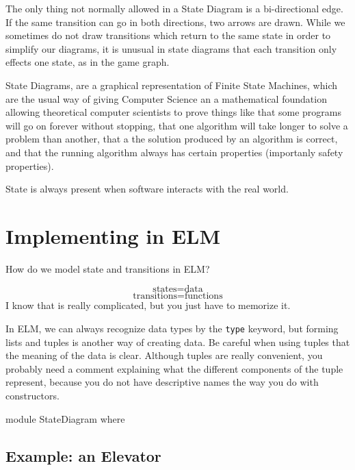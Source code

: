 \documentclass[12pt]{amsbook}
\begin{document}
The only thing not normally allowed in a State Diagram is a bi-directional edge.
If the same transition can go in both directions, two arrows are drawn.
While we sometimes do not draw transitions which return to the same state
in order to simplify our diagrams,
it is unusual in state diagrams that each transition only effects one state,
as in the game graph.

State Diagrams, are a graphical representation of Finite State Machines,
which are the usual way of giving Computer Science an a mathematical foundation 
allowing theoretical computer scientists to prove things like
that some programs will go on forever without stopping, 
that one algorithm will take longer to solve a problem than another,
that a the solution produced by an algorithm is correct,
and that the running algorithm always has certain properties (importanly safety properties).

State is always present when software interacts with the real world.

\section{Implementing in ELM}

How do we model state and transitions in ELM?

$$\text{states} = \text{data}$$
$$\text{transitions} = \text{functions}$$
I know that is really complicated, but you just have to memorize it.

In ELM, we can always recognize data types by the \verb|type| keyword,
but forming lists and tuples is another way of creating data.
Be careful when using tuples that the meaning of the data is clear.
Although tuples are really convenient, you probably need a comment explaining
what the different components of the tuple represent,
because you do not have descriptive names the way you do with constructors.

\vspace{-12pt}
\begin{code}
module StateDiagram where
\end{code}

\subsection{Example: an Elevator} 
\end{document}
